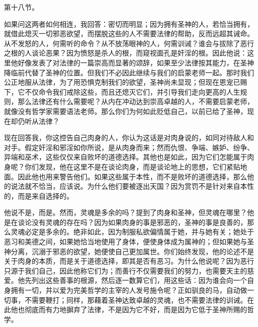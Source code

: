 第十八节。\par

如果问这两者如何相连，我回答：密切而明显；因为拥有圣神的人，若恰当拥有，就借此熄灭一切邪恶欲望，而摆脱这些的人不需要法律的帮助，反而远超其诫命。从不发怒的人，何需听的命令？从不放荡眼神的人，何需训诫？谁会与拔除了恶行之根的人谈论恶果？因为愤怒是杀人的根，而窥视面孔是奸淫的根。因此他说：这里他好像发表了对法律的一篇崇高而显著的颂辞，如果至少法律按其能力，在圣神降临前代替了圣神的位置。但我们不必因此继续与我们的启蒙老师一起。那时我们公正地服从法律，为了用恐惧克制我们的欲望，圣神尚未显现；但现在恩宠已赐下，它不仅命令我们戒除这些，而且还熄灭它们，并引导我们走向更高的人生规则，那么法律还有什么需要呢？从内在冲动达到崇高卓越的人，不需要启蒙老师，就像没有哲学家需要语法老师。那么你们为何如此贬低自己，以前已给了圣神，现在却仍听从法律？\par

\par

现在回答我，你这控告自己肉身的人，你认为这话是对肉身说的，如同对待敌人和对手。假定奸淫和邪淫如你所说，是从肉身而来；然而仇恨、争端、嫉妒、纷争、异端和巫术，这些仅仅来自败坏的道德选择。其他也是如此，因为它们怎能属于肉身呢？你们发现，他在这里不是在谈论肉身，而是谈论地上的思想，它们紧贴地面。因此他也用来警告他们。如果这些属于本性，而不是败坏的道德选择，那么他的说法就不恰当，应该说。为什么他们要被逐出天国？因为赏罚不是针对来自本性的，而是来自选择的。\par

\par

他说不是，而是。然而，灵魂是多余的吗？提到了肉身和圣神，但灵魂在哪里？他是在谈论没有灵魂的存在吗？因为如果肉身的事是邪恶的，圣神的事是良善的，那么灵魂必定是多余的。绝非如此，因为制服私欲偏情属于她，并与她有关；她处于恶习和美德之间，如果她恰当地使用了身体，便使身体成为属神的；但如果她与圣神分离，沉溺于邪恶的欲望，她便使自己更加属世。你们始终发现，他的论述不是关于肉身的本质，而是关于道德选择，即其是否有恶习。为什么他说呢？因为恶行只源于我们自己，因此他称它们为；而善行不仅需要我们的努力，也需要天主的慈爱。他先列出这些善事的根源，然后逐一数算它们，用这些话：因为谁会向一个自身拥有一切，并以爱为完美哲学的主宰的人发号施令呢？正如驯良的马，自动做一切事，不需要鞭打；同样，那藉着圣神达致卓越的灵魂，也不需要法律的训诫。在此他也彻底而有力地摒弃了法律，不是因为它不好，而是因为它低于圣神所赐的哲学。\par


